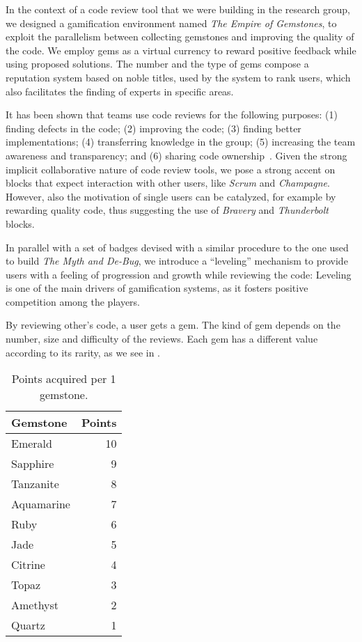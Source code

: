 In the context of a code review tool that we were building in the research group, we designed a gamification environment named \textit{The Empire of Gemstones}, to exploit the parallelism between collecting gemstones and improving the quality of the code.
We employ gems as a virtual currency to reward positive feedback while using proposed solutions.
The number and the type of gems compose a reputation system based on noble titles, used by the system to rank users, which also facilitates the finding of experts in specific areas.

It has been shown that teams use code reviews for the following purposes: (1) finding defects in the code; (2) improving the code; (3) finding better implementations; (4) transferring knowledge in the group; (5) increasing the team awareness and transparency; and (6) sharing code ownership~\cite{Bacc2013a,Bell2014a}.
Given the strong implicit collaborative nature of code review tools, we pose a strong accent on blocks that expect interaction with other users, like \emph{Scrum} and \emph{Champagne}.
However, also the motivation of single users can be catalyzed, for example by rewarding quality code, thus suggesting the use of \emph{Bravery} and \emph{Thunderbolt} blocks.

In parallel with a set of badges devised with a similar procedure to the one used to build \textit{The Myth and De-Bug}, we introduce a ``leveling'' mechanism to provide users with a feeling of progression and growth while reviewing the code: Leveling is one of the main drivers of gamification systems, as it fosters positive competition among the players.

By reviewing other's code, a user gets a gem.
The kind of gem depends on the number, size and difficulty of the reviews.
Each gem has a different value according to its rarity, as we see in .

\begin{table}[ht]\small
\centering
\caption{Points acquired per 1 gemstone.}
\begin{tabular}{l|r}
\textbf{Gemstone} & \textbf{Points} \\
\hline
\rowcolor{emerald}Emerald & 10\\
\rowcolor{sapphire!40}Sapphire & 9\\
\rowcolor{tanzanite}Tanzanite & 8\\
\rowcolor{aquamarine}Aquamarine & 7\\
\rowcolor{ruby}Ruby & 6\\
\rowcolor{jade}Jade & 5\\
\rowcolor{citrine}Citrine & 4\\
\rowcolor{topaz}Topaz & 3\\
\rowcolor{amethyst}Amethyst & 2\\
\rowcolor{quartz}Quartz & 1\\
\hline
\end{tabular}
\label{pointsgem}
\label{tab-gems}
\end{table}


